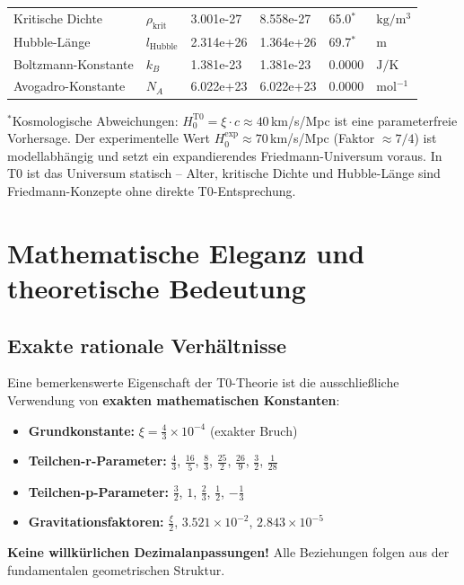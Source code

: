 \begin{longtable}{>{\raggedright}p{4.0cm}p{1.2cm}p{1.8cm}p{2.0cm}p{1.6cm}p{2.0cm}}
		Kritische Dichte & $\rho_{\text{krit}}$ & 3.001e-27 & 8.558e-27 & 65.0$^*$ & $\si{\kilogram \per \meter^3}$ \\
		Hubble-Länge & $l_{\text{Hubble}}$ & 2.314e+26 & 1.364e+26 & 69.7$^*$ & $\si{\meter}$ \\
		Boltzmann-Konstante & $k_B$ & 1.381e-23 & 1.381e-23 & 0.0000 & $\si{\joule \per \kelvin}$ \\
		Avogadro-Konstante & $N_A$ & 6.022e+23 & 6.022e+23 & 0.0000 & $\si{\mole^{-1}}$ \\
	\end{longtable}
	\normalsize
	
	{\small $^*$Kosmologische Abweichungen: $H_0^{\text{T0}} = \xi \cdot c \approx 40\,$km/s/Mpc ist eine parameterfreie Vorhersage. Der experimentelle Wert $H_0^{\text{exp}} \approx 70\,$km/s/Mpc (Faktor $\approx 7/4$) ist modellabhängig und setzt ein expandierendes Friedmann-Universum voraus. In T0 ist das Universum statisch -- Alter, kritische Dichte und Hubble-Länge sind Friedmann-Konzepte ohne direkte T0-Entsprechung.}
	
	\section{Mathematische Eleganz und theoretische Bedeutung}
	
	\subsection{Exakte rationale Verhältnisse}
	
	Eine bemerkenswerte Eigenschaft der T0-Theorie ist die ausschließliche Verwendung von \textbf{exakten mathematischen Konstanten}:
	
	\begin{itemize}
		\item \textbf{Grundkonstante:} $\xi = \frac{4}{3} \times 10^{-4}$ (exakter Bruch)
		\item \textbf{Teilchen-r-Parameter:} $\frac{4}{3}$, $\frac{16}{5}$, $\frac{8}{3}$, $\frac{25}{2}$, $\frac{26}{9}$, $\frac{3}{2}$, $\frac{1}{28}$
		\item \textbf{Teilchen-p-Parameter:} $\frac{3}{2}$, $1$, $\frac{2}{3}$, $\frac{1}{2}$, $-\frac{1}{3}$
		\item \textbf{Gravitationsfaktoren:} $\frac{\xi}{2}$, $3.521 \times 10^{-2}$, $2.843 \times 10^{-5}$
	\end{itemize}
	
	\textcolor{t0green}{\textbf{Keine willkürlichen Dezimalanpassungen!}} Alle Beziehungen folgen aus der fundamentalen geometrischen Struktur.
	
